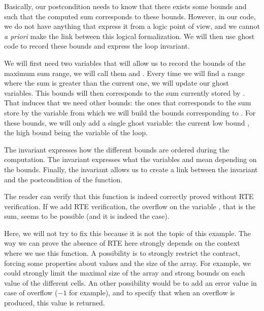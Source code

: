 Basically, our postcondition needs to know that there exists some bounds
 and  such that the computed sum corresponds to
these bounds. However, in our code, we do not have anything that express
it from a logic point of view, and we cannot \emph{a priori} make the
link between this logical formalization. We will then use ghost code to
record these bounds and express the loop invariant.

We will first need two variables that will allow us to record the bounds
of the maximum sum range, we will call them  and
. Every time we will find a range where the sum is greater
than the current one, we will update our ghost variables. This bounds
will then corresponds to the sum currently stored by . That
induces that we need other bounds: the ones that corresponds to the sum
store by the variable  from which we will build the bounds
corresponding to . For these bounds, we will only add a
single ghost variable: the current low bound , the high
bound being the variable  of the loop.






The invariant  expresses how the different bounds are
ordered during the computation. The invariant  expresses
what the variables  and  mean depending on the
bounds. Finally, the invariant  allows us to create a link
between the invariant and the postcondition of the function.



The reader can verify that this function is indeed correctly proved
without RTE verification. If we add RTE verification, the overflow on
the variable , that is the sum, seems to be possible (and it
is indeed the case).




Here, we will not try to fix this because it is not the topic of this
example. The way we can prove the absence of RTE here strongly depends
on the context where we use this function. A possibility is to strongly
restrict the contract, forcing some properties about values and the size
of the array. For example, we could strongly limit the maximal size of
the array and strong bounds on each value of the different cells. An
other possibility would be to add an error value in case of overflow
(\(-1\) for example), and to specify that when an overflow is produced,
this value is returned.
